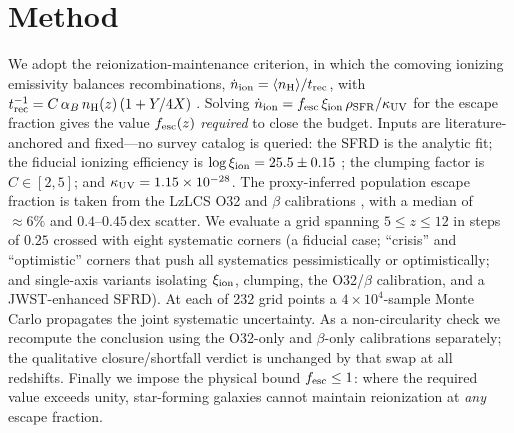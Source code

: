 \documentclass[twocolumn]{aastex631}
\begin{document}
\section{Method}
We adopt the reionization-maintenance criterion, in which the comoving ionizing emissivity balances recombinations, $\dot{n}_{\rm ion}=\langle n_{\rm H}\rangle/t_{\rm rec}$, with $t_{\rm rec}^{-1}=C\,\alpha_B\,n_{\rm H}(z)\,(1+Y/4X)$ \citep[case-B, $T=2\times10^4$\,K;][]{Robertson2015}. Solving $\dot{n}_{\rm ion}=f_{\rm esc}\,\xi_{\rm ion}\,\rho_{\rm SFR}/\kappa_{\rm UV}$ for the escape fraction gives the value $f_{\rm esc}(z)$ \emph{required} to close the budget. Inputs are literature-anchored and fixed---no survey catalog is queried: the SFRD is the \citet{MadauDickinson2014} analytic fit; the fiducial ionizing efficiency is $\log\xi_{\rm ion}=25.5\pm0.15$ \citep{Simmonds2024}; the clumping factor is $C\in[2,5]$; and $\kappa_{\rm UV}=1.15\times10^{-28}$. The proxy-inferred population escape fraction is taken from the LzLCS O32 and $\beta$ calibrations \citep{Chisholm2022,Flury2022}, with a median of $\approx6\%$ and $0.4$--$0.45$\,dex scatter. We evaluate a grid spanning $5\le z\le12$ in steps of $0.25$ crossed with eight systematic corners (a fiducial case; ``crisis'' and ``optimistic'' corners that push all systematics pessimistically or optimistically; and single-axis variants isolating $\xi_{\rm ion}$, clumping, the O32/$\beta$ calibration, and a JWST-enhanced SFRD). At each of 232 grid points a $4\times10^4$-sample Monte Carlo propagates the joint systematic uncertainty. As a non-circularity check we recompute the conclusion using the O32-only and $\beta$-only calibrations separately; the qualitative closure/shortfall verdict is unchanged by that swap at all redshifts. Finally we impose the physical bound $f_{\rm esc}\le1$: where the required value exceeds unity, star-forming galaxies cannot maintain reionization at \emph{any} escape fraction.
\end{document}
